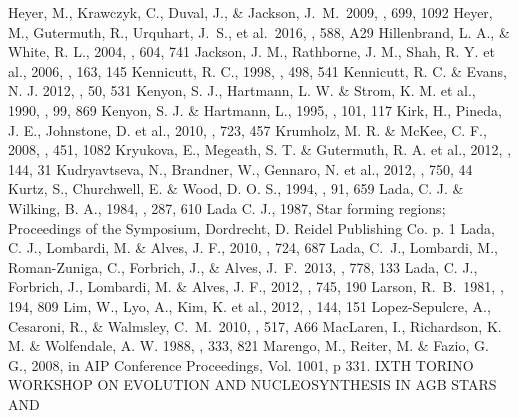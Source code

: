 \documentclass[iop]{emulateapj}
\begin{document}
\begin{thebibliography}{}
 Heyer, M., Krawczyk, C., Duval, J., \& Jackson, J.~M.\ 2009, \apj, 699, 1092 
{ Heyer, M., Gutermuth, R., Urquhart, J.~S., et al.\ 2016, \aap, 588, A29 }
 Hillenbrand, L. A., \& White, R. L., 2004, \apj, 604, 741
 Jackson, J. M., Rathborne, J. M., Shah, R. Y. et al., 2006, \apj, 163, 145
 Kennicutt, R. C., 1998, \apj, 498, 541
 Kennicutt, R. C. \& Evans, N. J. 2012, \araa, 50, 531
 Kenyon, S. J.,  Hartmann, L. W. \& Strom, K. M. et al., 1990, \aj, 99, 869
 Kenyon, S. J. \& Hartmann, L., 1995, \apjs, 101, 117
 Kirk, H., Pineda, J. E., Johnstone, D. et al., 2010, \apj, 723, 457
 Krumholz, M. R. \& McKee, C. F., 2008, \nat, 451, 1082 
 Kryukova, E., Megeath, S. T. \& Gutermuth, R. A. et al., 2012, \aj, 144, 31
 Kudryavtseva, N., Brandner, W., Gennaro, N. et al., 2012, \apj, 750, 44
 Kurtz, S., Churchwell, E. \& Wood, D. O. S., 1994, \apjs, 91, 659
 Lada, C. J. \& Wilking, B. A., 1984,  \apj, 287, 610
 Lada C. J., 1987, Star forming regions; Proceedings of the Symposium,
  Dordrecht, D. Reidel Publishing Co. p. 1
 Lada, C. J., Lombardi, M. \& Alves, J. F., 2010, \apj, 724, 687
 Lada, C.~J., Lombardi, M., 
Roman-Zuniga, C., Forbrich, J., \& Alves, J.~F.\ 2013, \apj, 778, 133 
 Lada, C. J., Forbrich, J., Lombardi, M. \& Alves, J. F., 2012, \apj, 745, 190
 Larson, R.~B.\ 1981, \mnras, 194, 809 
 Lim, W., Lyo, A., Kim, K. et al., 2012, \aj, 144, 151
 Lopez-Sepulcre, A., Cesaroni, R., \& Walmsley, C.~M.\ 2010, \aap, 517, A66 
 MacLaren, I., Richardson, K. M. \& Wolfendale, A. W. 1988, \apj, 333, 821
 Marengo, M., Reiter, M. \& Fazio, G. G., 2008,
  in AIP Conference Proceedings, Vol. 1001, p 331. IXTH TORINO WORKSHOP ON
  EVOLUTION AND NUCLEOSYNTHESIS IN AGB STARS AND

\end{thebibliography}
\end{document}

